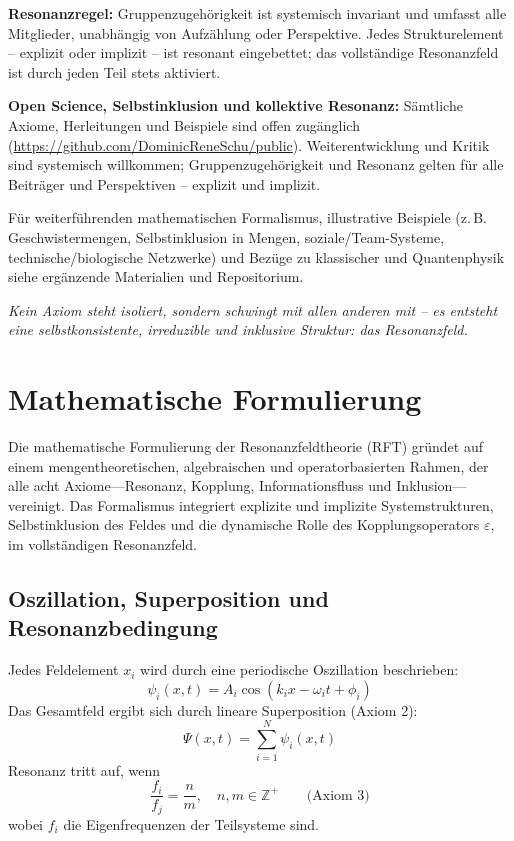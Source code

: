 \documentclass[12pt]{article}
\begin{document}
\medskip

\textbf{Resonanzregel:}  
Gruppenzugehörigkeit ist systemisch invariant und umfasst alle Mitglieder, unabhängig von Aufzählung oder Perspektive. Jedes Strukturelement – explizit oder implizit – ist resonant eingebettet; das vollständige Resonanzfeld ist durch jeden Teil stets aktiviert.

\medskip

\textbf{Open Science, Selbstinklusion und kollektive Resonanz:}  
Sämtliche Axiome, Herleitungen und Beispiele sind offen zugänglich (\url{https://github.com/DominicReneSchu/public}). Weiterentwicklung und Kritik sind systemisch willkommen; Gruppenzugehörigkeit und Resonanz gelten für alle Beiträger und Perspektiven – explizit und implizit.

\medskip

Für weiterführenden mathematischen Formalismus, illustrative Beispiele (z. B. Geschwistermengen, Selbstinklusion in Mengen, soziale/Team-Systeme, technische/biologische Netzwerke) und Bezüge zu klassischer und Quantenphysik siehe ergänzende Materialien und Repositorium.

\medskip

\textit{Kein Axiom steht isoliert, sondern schwingt mit allen anderen mit – es entsteht eine selbstkonsistente, irreduzible und inklusive Struktur: das Resonanzfeld.}

\section{Mathematische Formulierung}

Die mathematische Formulierung der Resonanzfeldtheorie (RFT) gründet auf einem mengentheoretischen, algebraischen und operatorbasierten Rahmen, der alle acht Axiome—Resonanz, Kopplung, Informationsfluss und Inklusion—vereinigt. Das Formalismus integriert explizite und implizite Systemstrukturen, Selbstinklusion des Feldes und die dynamische Rolle des Kopplungsoperators $\varepsilon$, im vollständigen Resonanzfeld.

\subsection{Oszillation, Superposition und Resonanzbedingung}

Jedes Feldelement $x_i$ wird durch eine periodische Oszillation beschrieben:
\[
\psi_i(x, t) = A_i \cos(k_i x - \omega_i t + \phi_i)
\]
Das Gesamtfeld ergibt sich durch lineare Superposition (Axiom 2):
\[
\Psi(x, t) = \sum_{i=1}^N \psi_i(x, t)
\]
Resonanz tritt auf, wenn
\[
\frac{f_i}{f_j} = \frac{n}{m}, \quad n, m \in \mathbb{Z}^+ \qquad \text{(Axiom 3)}
\]
wobei $f_i$ die Eigenfrequenzen der Teilsysteme sind.
\end{document}
